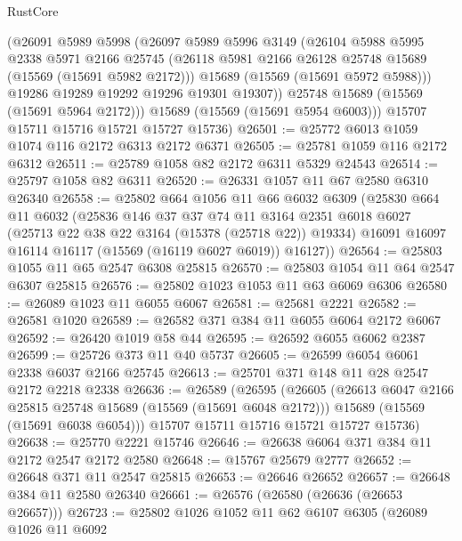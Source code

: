 \begin{lexlean}{RustCore}
\begin{coremodule}
          (@26091
            @5989
            @5998
            (@26097
              @5989
              @5996
              @3149
              (@26104
                @5988
                @5995
                @2338
                @5971
                @2166
                @25745
                (@26118 @5981 @2166 @26128 @25748 @15689 (@15569 (@15691 @5982 @2172)))
                @15689
                (@15569 (@15691 @5972 @5988)))
              @19286
              @19289
              @19292
              @19296
              @19301
              @19307))
          @25748
          @15689
          (@15569 (@15691 @5964 @2172)))
        @15689
        (@15569 (@15691 @5954 @6003)))
      @15707
      @15711
      @15716
      @15721
      @15727
      @15736)
@26501 := @25772 @6013 @1059 @1074 @116 @2172 @6313 @2172 @6371
@26505 := @25781 @1059 @116 @2172 @6312
@26511 := @25789 @1058 @82 @2172 @6311 @5329 @24543
@26514 := @25797 @1058 @82 @6311
@26520 := @26331 @1057 @11 @67 @2580 @6310 @26340
@26558 := @25802
    @664
    @1056
    @11
    @66
    @6032
    @6309
    (@25830
      @664
      @11
      @6032
      (@25836
        @146
        @37
        @37
        @74
        @11
        @3164
        @2351
        @6018
        @6027
        (@25713 @22 @38 @22 @3164 (@15378 (@25718 @22)) @19334)
        @16091
        @16097
        @16114
        @16117
        (@15569 (@16119 @6027 @6019))
        @16127))
@26564 := @25803 @1055 @11 @65 @2547 @6308 @25815
@26570 := @25803 @1054 @11 @64 @2547 @6307 @25815
@26576 := @25802 @1023 @1053 @11 @63 @6069 @6306
@26580 := @26089 @1023 @11 @6055 @6067
@26581 := @25681 @2221
@26582 := @26581 @1020
@26589 := @26582 @371 @384 @11 @6055 @6064 @2172 @6067
@26592 := @26420 @1019 @58 @44
@26595 := @26592 @6055 @6062 @2387
@26599 := @25726 @373 @11 @40 @5737
@26605 := @26599 @6054 @6061 @2338 @6037 @2166 @25745
@26613 := @25701 @371 @148 @11 @28 @2547 @2172 @2218 @2338
@26636 := @26589
    (@26595
      (@26605
        (@26613 @6047 @2166 @25815 @25748 @15689 (@15569 (@15691 @6048 @2172)))
        @15689
        (@15569 (@15691 @6038 @6054)))
      @15707
      @15711
      @15716
      @15721
      @15727
      @15736)
@26638 := @25770 @2221 @15746
@26646 := @26638 @6064 @371 @384 @11 @2172 @2547 @2172 @2580
@26648 := @15767 @25679 @2777
@26652 := @26648 @371 @11 @2547 @25815
@26653 := @26646 @26652
@26657 := @26648 @384 @11 @2580 @26340
@26661 := @26576 (@26580 (@26636 (@26653 @26657)))
@26723 := @25802
    @1026
    @1052
    @11
    @62
    @6107
    @6305
    (@26089
      @1026
      @11
      @6092

\end{coremodule}
\end{lexlean}

